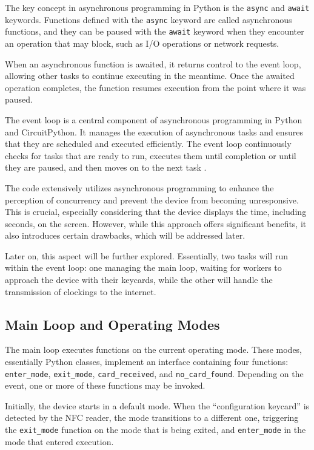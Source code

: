 The key concept in asynchronous programming in Python is the \texttt{async} and \texttt{await} 
keywords. Functions defined with the \texttt{async} keyword are called asynchronous functions, and 
they can be paused with the \texttt{await} keyword when they encounter an operation that may block, 
such as I/O operations or network requests.

When an asynchronous function is awaited, it returns control to the event loop, allowing other 
tasks to continue executing in the meantime. Once the awaited operation completes, the function 
resumes execution from the point where it was paused.

The event loop is a central component of asynchronous programming in Python and CircuitPython. It 
manages the execution of asynchronous tasks and ensures that they are scheduled and executed 
efficiently. The event loop continuously checks for tasks that are ready to run, executes them 
until completion or until they are paused, and then moves on to the next task 
\cite{circuitpython_docs}.

The code extensively utilizes asynchronous programming to enhance the perception of concurrency 
and prevent the device from becoming unresponsive. This is crucial, especially considering that the 
device displays the time, including seconds, on the screen. However, while this approach offers 
significant benefits, it also introduces certain drawbacks, which will be addressed later.

Later on, this aspect will be further explored. Essentially, two tasks will run within the event 
loop: one managing the main loop, waiting for workers to approach the device with their keycards, 
while the other will handle the transmission of clockings to the internet.

\subsection{Main Loop and Operating Modes}

The main loop executes functions on the current operating mode. These modes, essentially Python 
classes, implement an interface containing four functions:\\ \texttt{enter\_mode}, 
\texttt{exit\_mode}, \texttt{card\_received}, and \texttt{no\_card\_found}. Depending on the event, 
one or more of these functions may be invoked.

Initially, the device starts in a default mode. When the ``configuration keycard'' is detected by 
the NFC reader, the mode transitions to a different one, triggering the \texttt{exit\_mode} 
function on the mode that is being exited, and \texttt{enter\_mode} in the mode that entered 
execution.

